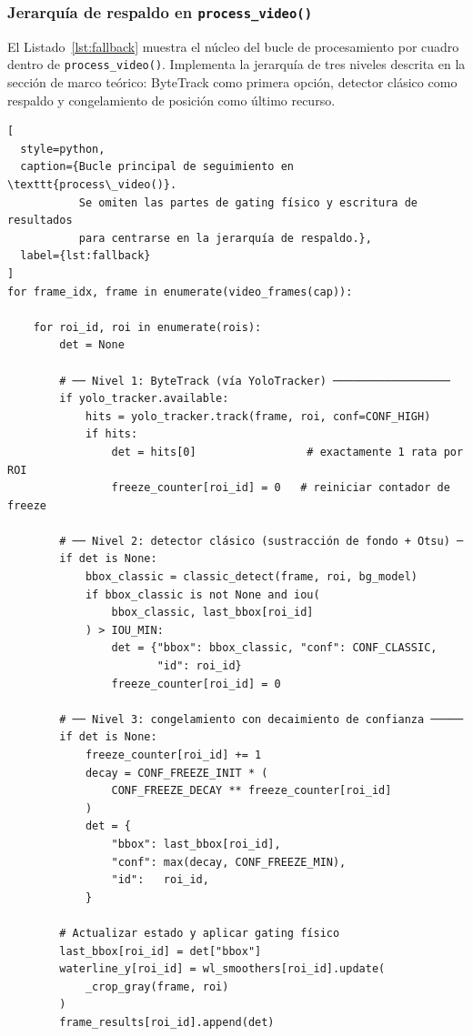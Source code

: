 
\subsubsection{Jerarquía de respaldo en \texttt{process\_video()}}

El Listado~\ref{lst:fallback} muestra el núcleo del bucle de procesamiento
por cuadro dentro de \texttt{process\_video()}. Implementa la jerarquía de
tres niveles descrita en la sección de marco teórico: ByteTrack como
primera opción, detector clásico como respaldo y congelamiento de posición
como último recurso.

\begin{lstlisting}[
  style=python,
  caption={Bucle principal de seguimiento en \texttt{process\_video()}.
           Se omiten las partes de gating físico y escritura de resultados
           para centrarse en la jerarquía de respaldo.},
  label={lst:fallback}
]
for frame_idx, frame in enumerate(video_frames(cap)):

    for roi_id, roi in enumerate(rois):
        det = None

        # ── Nivel 1: ByteTrack (vía YoloTracker) ──────────────────
        if yolo_tracker.available:
            hits = yolo_tracker.track(frame, roi, conf=CONF_HIGH)
            if hits:
                det = hits[0]                 # exactamente 1 rata por ROI
                freeze_counter[roi_id] = 0   # reiniciar contador de freeze

        # ── Nivel 2: detector clásico (sustracción de fondo + Otsu) ─
        if det is None:
            bbox_classic = classic_detect(frame, roi, bg_model)
            if bbox_classic is not None and iou(
                bbox_classic, last_bbox[roi_id]
            ) > IOU_MIN:
                det = {"bbox": bbox_classic, "conf": CONF_CLASSIC,
                       "id": roi_id}
                freeze_counter[roi_id] = 0

        # ── Nivel 3: congelamiento con decaimiento de confianza ─────
        if det is None:
            freeze_counter[roi_id] += 1
            decay = CONF_FREEZE_INIT * (
                CONF_FREEZE_DECAY ** freeze_counter[roi_id]
            )
            det = {
                "bbox": last_bbox[roi_id],
                "conf": max(decay, CONF_FREEZE_MIN),
                "id":   roi_id,
            }

        # Actualizar estado y aplicar gating físico
        last_bbox[roi_id] = det["bbox"]
        waterline_y[roi_id] = wl_smoothers[roi_id].update(
            _crop_gray(frame, roi)
        )
        frame_results[roi_id].append(det)
\end{lstlisting}

